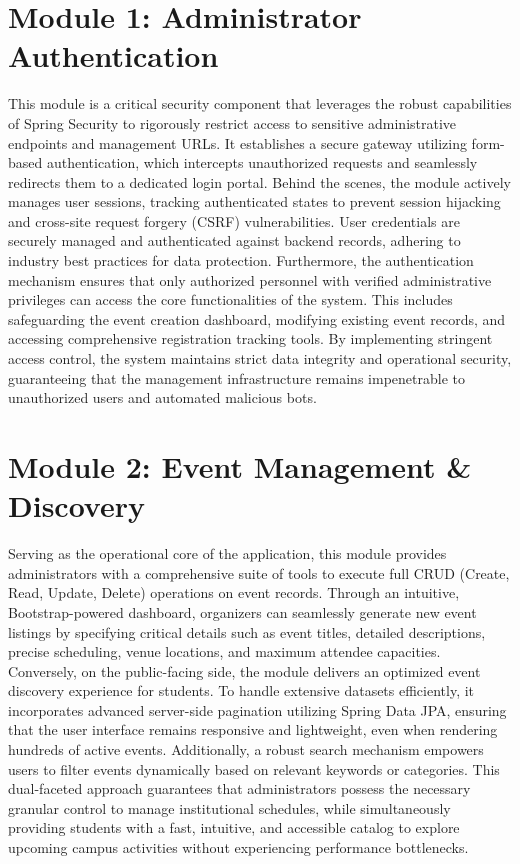 \documentclass[12pt]{report}
\begin{document}
\section{Module 1: Administrator Authentication} 
This module is a critical security component that leverages the robust capabilities of Spring Security to rigorously restrict access to sensitive administrative endpoints and management URLs. It establishes a secure gateway utilizing form-based authentication, which intercepts unauthorized requests and seamlessly redirects them to a dedicated login portal. Behind the scenes, the module actively manages user sessions, tracking authenticated states to prevent session hijacking and cross-site request forgery (CSRF) vulnerabilities. User credentials are securely managed and authenticated against backend records, adhering to industry best practices for data protection. Furthermore, the authentication mechanism ensures that only authorized personnel with verified administrative privileges can access the core functionalities of the system. This includes safeguarding the event creation dashboard, modifying existing event records, and accessing comprehensive registration tracking tools. By implementing stringent access control, the system maintains strict data integrity and operational security, guaranteeing that the management infrastructure remains impenetrable to unauthorized users and automated malicious bots.

\section{Module 2: Event Management \& Discovery} 
Serving as the operational core of the application, this module provides administrators with a comprehensive suite of tools to execute full CRUD (Create, Read, Update, Delete) operations on event records. Through an intuitive, Bootstrap-powered dashboard, organizers can seamlessly generate new event listings by specifying critical details such as event titles, detailed descriptions, precise scheduling, venue locations, and maximum attendee capacities. Conversely, on the public-facing side, the module delivers an optimized event discovery experience for students. To handle extensive datasets efficiently, it incorporates advanced server-side pagination utilizing Spring Data JPA, ensuring that the user interface remains responsive and lightweight, even when rendering hundreds of active events. Additionally, a robust search mechanism empowers users to filter events dynamically based on relevant keywords or categories. This dual-faceted approach guarantees that administrators possess the necessary granular control to manage institutional schedules, while simultaneously providing students with a fast, intuitive, and accessible catalog to explore upcoming campus activities without experiencing performance bottlenecks.
\end{document}
